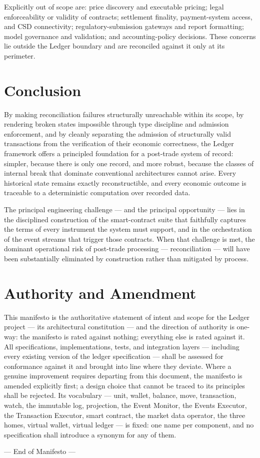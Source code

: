 \documentclass[11pt,a4paper]{article}
\begin{document}
Explicitly out of scope are: price discovery and executable pricing;
legal enforceability or validity of contracts; settlement finality,
payment-system access, and CSD connectivity; regulatory-submission
gateways and report formatting; model governance and validation; and
accounting-policy decisions. These concerns lie outside the Ledger
boundary and are reconciled against it only at its perimeter.

\hypertarget{conclusion}{%
\section{Conclusion}\label{conclusion}}

By making reconciliation failures structurally unreachable within its
scope, by rendering broken states impossible through type discipline and
admission enforcement, and by cleanly separating the admission of
structurally valid transactions from the verification of their economic
correctness, the Ledger framework offers a principled foundation for a
post-trade system of record: simpler, because there is only one record,
and more robust, because the classes of internal break that dominate
conventional architectures cannot arise. Every historical state remains
exactly reconstructible, and every economic outcome is traceable to a
deterministic computation over recorded data.

The principal engineering challenge --- and the principal opportunity
--- lies in the disciplined construction of the smart-contract suite
that faithfully captures the terms of every instrument the system must
support, and in the orchestration of the event streams that trigger
those contracts. When that challenge is met, the dominant operational
risk of post-trade processing --- reconciliation --- will have been
substantially eliminated by construction rather than mitigated by
process.

\hypertarget{authority-and-amendment}{%
\section{Authority and Amendment}\label{authority-and-amendment}}

This manifesto is the authoritative statement of intent and scope for
the Ledger project --- its architectural constitution --- and the
direction of authority is one-way: the manifesto is rated against
nothing; everything else is rated against it. All specifications,
implementations, tests, and integration layers --- including every
existing version of the ledger specification --- shall be assessed for
conformance against it and brought into line where they deviate. Where a
genuine improvement requires departing from this document, the manifesto
is amended explicitly first; a design choice that cannot be traced to
its principles shall be rejected. Its vocabulary --- unit, wallet,
balance, move, transaction, watch, the immutable log, projection, the
Event Monitor, the Events Executor, the Transaction Executor, smart
contract, the market data operator, the three homes, virtual wallet,
virtual ledger --- is fixed: one name per component, and no
specification shall introduce a synonym for any of them.

--- End of Manifesto ---
\end{document}
